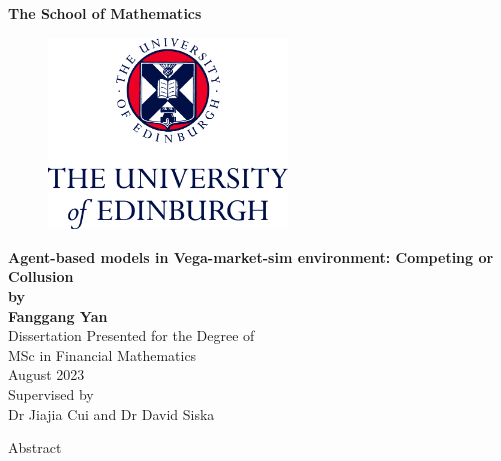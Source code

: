 \documentclass[11pt,twoside]{article}
\numberwithin{Theorem}{section}
\numberwithin{Definition}{section}
\numberwithin{Lemma}{section}
\numberwithin{Algorithm}{section}
\numberwithin{equation}{section}
\begin{document}
\pagestyle{empty}

\begin{titlepage}
\vspace*{.5em}
\center
\textbf{\large{The School of Mathematics\\}}
\vspace*{1em}
\begin{figure}[!h]
\centering
\includegraphics[width=180pt]{CentredLogoCMYK.jpg}
\end{figure}
\vspace{2em}
\textbf{\Huge{Agent-based models in Vega-market-sim environment: Competing or Collusion }}\\[2em]
\textbf{\LARGE{by}}\\
\vspace{2em}
\textbf{\LARGE{Fanggang Yan}}\\
\vspace{6.5em}
\Large{Dissertation Presented for the Degree of\\
MSc in Financial Mathematics}\\
\vspace{6.5em}
\Large{August 2023}\\
\vspace{3em}
\Large{Supervised by\\Dr Jiajia Cui and Dr David Siska}
\vfill
\end{titlepage}

\cleardoublepage


\begin{center}
\Large{Abstract}
\end{center}
\end{document}
